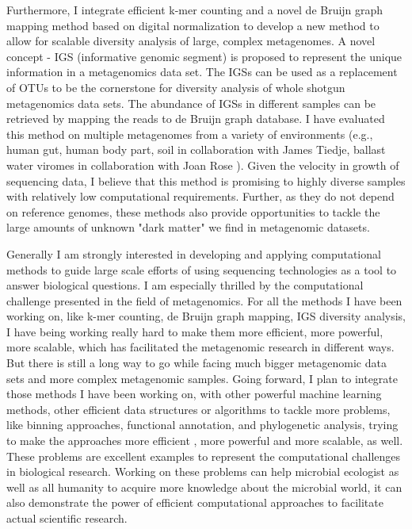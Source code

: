 \documentclass[12pt]{article}
\theoremstyle{plain} \numberwithin{equation}{section}
\theoremstyle{definition}
\begin{document}
Furthermore, I integrate efficient k-mer counting and a novel de Bruijn graph mapping method based on digital normalization to develop a new method to allow for scalable diversity analysis of large, complex metagenomes.  A novel concept - IGS (informative genomic segment) is proposed to represent the 
unique information in a metagenomics data set. The IGSs can be used as a replacement of OTUs to be the cornerstone for diversity analysis of whole shotgun metagenomics data sets. The abundance of IGSs in different samples can be retrieved by mapping the reads to de Bruijn graph database. I have evaluated this method on multiple metagenomes from a variety of environments (e.g., human gut, human body part, soil in collaboration with James Tiedje, ballast water viromes in collaboration with Joan Rose ). Given the velocity in growth of sequencing data, I believe that this method is promising to highly diverse samples with relatively low computational requirements. Further, as they do not depend on reference genomes, these methods also provide opportunities to tackle the large amounts of unknown "dark matter" we find in metagenomic datasets.

Generally I am strongly interested in developing and applying computational methods to guide large scale efforts of using sequencing technologies as a tool to answer biological questions. I am especially thrilled by the computational challenge presented in the field of metagenomics. For all the methods I have been working on, like k-mer counting, de Bruijn graph mapping, IGS diversity analysis, I have being working really hard to make them more efficient, more powerful, more scalable, which has facilitated the metagenomic research in different ways. But there is still a long way to go while facing much bigger metagenomic data sets and more complex metagenomic samples.  Going forward, I plan to integrate those methods I have been working on, with other powerful machine learning methods, other efficient data structures or algorithms to tackle more problems, like  binning approaches, functional annotation, and phylogenetic analysis,  trying to make the approaches more efficient , more powerful and more scalable, as well.  These problems are excellent examples to represent the computational challenges in biological research. Working on these problems can help microbial ecologist as well as all humanity to acquire more knowledge about the microbial world, it can also demonstrate  the power of efficient computational approaches to facilitate actual scientific research. 



\raisebox{1cm}
\end{document}
